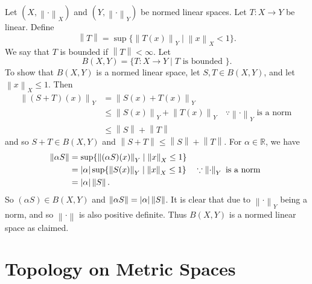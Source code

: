 \documentclass[notoc,notitlepage]{tufte-book}
\newcommand{\norm}[1]{\left\| #1 \right\|}
\begin{document}
\begin{eg}
  Let $(X, \norm\cdot_X)$ and $(Y, \norm\cdot_Y)$ be normed linear spaces. Let $T : X \to Y$ be linear. Define
  \begin{equation*}
    \norm{T} = \sup \{ \norm{T(x)}_Y \mid \norm{x}_X < 1 \}.
  \end{equation*}
  We say that $T$ is bounded if $\norm{T} < \infty$. Let
  \begin{equation*}
    B(X, Y) = \{ T : X \to Y \mid T \text{ is bounded } \}.
  \end{equation*}
  To show that $B(X, Y)$ is a normed linear space, let $S, T \in B(X, Y)$, and let $\norm{x}_X \leq 1$. Then
  \begin{align*}
    \norm{(S + T)(x)}_Y &= \norm{S(x) + T(x)}_Y \\
                        &\leq \norm{S(x)}_Y + \norm{T(x)}_Y \quad \because \norm\cdot_Y \text{ is a norm } \\
                        &\leq \norm{S} + \norm{T}
  \end{align*}
  and so $S + T \in B(X, Y)$ and $\norm{S + T} \leq \norm{S} + \norm{T}$. For $\alpha \in \mathbb{R}$, we have
  \begin{align*}
    \norm{\alpha S} &= \sup \{ \norm{(\alpha S)(x)}_Y \mid \norm{x}_X \leq 1 \} \\
                    &= \abs{\alpha} \sup \{ \norm{S(x)}_Y \mid \norm{x}_X \leq 1 \} \quad \because \norm\cdot_Y \text{ is a norm } \\
                    &= \abs{\alpha} \norm{S}.
  \end{align*}
  So $(\alpha S) \in B(X, Y)$ and $\norm{\alpha S} = \abs{\alpha} \norm{S}$. It is clear that due to $\norm\cdot_Y$ being a norm, and so $\norm\cdot$ is also positive definite. Thus $B(X, Y)$ is a normed linear space as claimed.
\end{eg}


\section{Topology on Metric Spaces}%
\label{sec:topology_on_metric_spaces}
\end{document}
